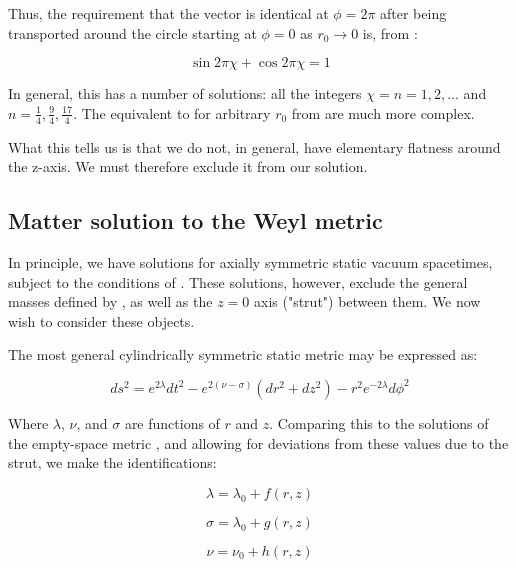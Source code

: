 \documentclass{article}
\begin{document}
Thus, the requirement that the vector is identical at $\phi=2\pi$
after being transported around the circle starting at $\phi=0$ as
$r_0\rightarrow 0$ is, from :

\begin{equation}
  \label{eq:lim-2-pi}
  \sin 2\pi\chi + \cos 2\pi\chi = 1
\end{equation}

In general, this has a number of solutions: all the integers
$\chi=n=1,2,\ldots$ and $n=\frac{1}{4}, \frac{9}{4}, \frac{17}{4}$. The equivalent to  for
arbitrary $r_0$ from  are much more
complex.

What this tells us is that we do not, in general, have elementary flatness around the z-axis. We must therefore exclude it from our solution.

\subsection{Matter solution to the Weyl metric}

In principle, we have solutions for axially symmetric static vacuum spacetimes, subject to the conditions of . These solutions, however, exclude the general masses defined by , as well as the $z=0$ axis ("strut") between them. We now wish to consider these objects. 

The most general cylindrically symmetric static metric may be expressed as:

\begin{equation}
ds^{2}=e^{2\lambda}dt^{2}-e^{2\left(\nu-\sigma\right)}\left(dr^{2}+dz^{2}\right)-r^{2}e^{-2\lambda}d\phi^{2}
\label{eq:weyl-metric}
\end{equation}

Where $\lambda$, $\nu$, and $\sigma$ are functions of $r$ and $z$. Comparing this to the solutions of the empty-space metric , and allowing for deviations from these values due to the strut, we make the identifications:

\begin{equation}
	\lambda=\lambda_0 + f(r,z)
\end{equation}

\begin{equation}
	\sigma=\lambda_0 + g(r,z)
\end{equation}

\begin{equation}
	\nu=\nu_0 + h(r,z)
\end{equation}
\end{document}
